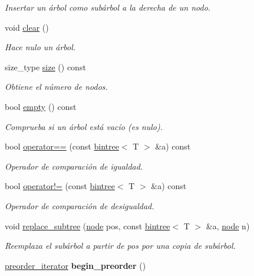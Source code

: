 \begin{DoxyCompactItemize}
\begin{DoxyCompactList}\small\item\em Insertar un árbol como subárbol a la derecha de un nodo. \end{DoxyCompactList}\item 
void \hyperlink{classbintree_a2078f7f9254a84b592fdb1f2e2f9238a}{clear} ()
\begin{DoxyCompactList}\small\item\em Hace nulo un árbol. \end{DoxyCompactList}\item 
size\+\_\+type \hyperlink{classbintree_a05abb18037587082a67fb4d4d2f5733f}{size} () const 
\begin{DoxyCompactList}\small\item\em Obtiene el número de nodos. \end{DoxyCompactList}\item 
bool \hyperlink{classbintree_a772126c3e8b7cd37e5a93ccbda01f8dd}{empty} () const 
\begin{DoxyCompactList}\small\item\em Comprueba si un árbol está vacío (es nulo). \end{DoxyCompactList}\item 
bool \hyperlink{classbintree_a29438cd817b1d27ccc10d46676ba6bef}{operator==} (const \hyperlink{classbintree}{bintree}$<$ T $>$ \&a) const 
\begin{DoxyCompactList}\small\item\em Operador de comparación de igualdad. \end{DoxyCompactList}\item 
bool \hyperlink{classbintree_a80e397f887ebad1ef974ec7722430a6c}{operator!=} (const \hyperlink{classbintree}{bintree}$<$ T $>$ \&a) const 
\begin{DoxyCompactList}\small\item\em Operador de comparación de desigualdad. \end{DoxyCompactList}\item 
void \hyperlink{classbintree_a75647277e4d20981651450e86ffad165}{replace\+\_\+subtree} (\hyperlink{classbintree_1_1node}{node} pos, const \hyperlink{classbintree}{bintree}$<$ T $>$ \&a, \hyperlink{classbintree_1_1node}{node} n)
\begin{DoxyCompactList}\small\item\em Reemplaza el subárbol a partir de pos por una copia de subárbol. \end{DoxyCompactList}\item 
\hypertarget{classbintree_aa03570e8e81b0f6e12a0901caa631973}{}\hyperlink{classbintree_1_1preorder__iterator}{preorder\+\_\+iterator} {\bfseries begin\+\_\+preorder} ()\label{classbintree_aa03570e8e81b0f6e12a0901caa631973}


\end{DoxyCompactItemize}
